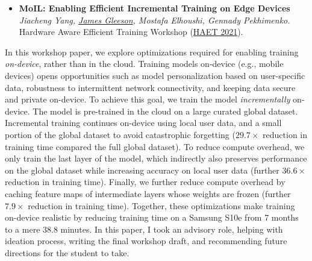 \documentclass[letterpaper,11pt]{article}
\begin{document}
\begin{itemize}[leftmargin=*]
\item 
    \noindent
    \textbf{MoIL: Enabling Efficient Incremental Training on Edge Devices} \\
    \noindent
    \textit{Jiacheng Yang, \underline{James Gleeson}, Mostafa Elhoushi, Gennady Pekhimenko.} \\
    \noindent
    Hardware Aware Efficient Training Workshop (\href{https://haet2021.github.io}{HAET 2021}).

\end{itemize}
\vspace{-1em}
%
In this workshop paper, we explore optimizations required for enabling training \emph{on-device}, rather than in the cloud.
Training models on-device (e.g., mobile devices) opens opportunities such as model personalization based on user-specific data, robustness to intermittent network connectivity, and keeping data secure and private on-device.
To achieve this goal, we train the model \emph{incrementally} on-device.  
The model is pre-trained in the cloud on a large curated global dataset.
Incremental training continues on-device using local user data, and a small portion of the global dataset to avoid catastrophic forgetting ($29.7\times$ reduction in training time compared the full global dataset).
To reduce compute overhead, we only train the last layer of the model, which indirectly also preserves performance on the global dataset while increasing accuracy on local user data (further $36.6\times$ reduction in training time).
Finally, we further reduce compute overhead by caching feature maps of intermediate layers whose weights are frozen (further $7.9\times$ reduction in training time).  Together, these optimizations make training on-device realistic by reducing training time on a Samsung S10e from 7 months to a mere 38.8 minutes.
In this paper, I took an advisory role, helping with ideation process, writing the final workshop draft, and recommending future directions for the student to take.
\end{document}
